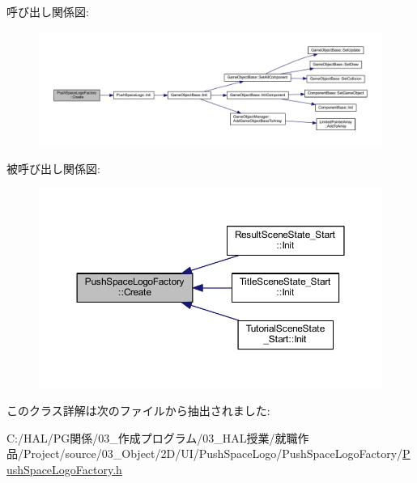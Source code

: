 呼び出し関係図\+:\nopagebreak
\begin{figure}[H]
\begin{center}
\leavevmode
\includegraphics[width=350pt]{class_push_space_logo_factory_a40ed4a7781d8f5a6e802b90f3aa599cb_cgraph}
\end{center}
\end{figure}
被呼び出し関係図\+:\nopagebreak
\begin{figure}[H]
\begin{center}
\leavevmode
\includegraphics[width=350pt]{class_push_space_logo_factory_a40ed4a7781d8f5a6e802b90f3aa599cb_icgraph}
\end{center}
\end{figure}


このクラス詳解は次のファイルから抽出されました\+:\begin{DoxyCompactItemize}
\item 
C\+:/\+H\+A\+L/\+P\+G関係/03\+\_\+作成プログラム/03\+\_\+\+H\+A\+L授業/就職作品/\+Project/source/03\+\_\+\+Object/2\+D/\+U\+I/\+Push\+Space\+Logo/\+Push\+Space\+Logo\+Factory/\mbox{\hyperlink{_push_space_logo_factory_8h}{Push\+Space\+Logo\+Factory.\+h}}\end{DoxyCompactItemize}

